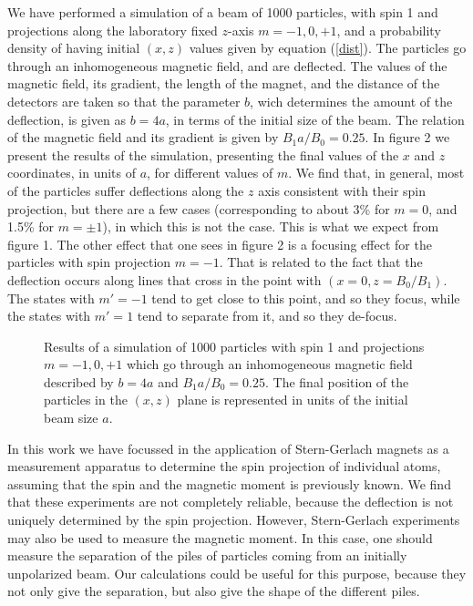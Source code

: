 \documentclass[aps,preprint,prl]{revtex4-2}
\begin{document}
We have performed a simulation of a beam of 1000
particles, with spin 1 and projections along the laboratory fixed $z$-axis 
$m=-1,0,+1$,
and  a  probability density of having initial $(x,z)$ values 
given by equation (\ref{dist}).  The particles go through  an inhomogeneous 
magnetic field, and are deflected. The values of the magnetic field, 
its gradient, the length of the magnet, and the distance of the detectors are
taken so that the parameter $b$, wich determines the amount of the deflection, 
is given as $b=4a$, in terms of the initial size of the beam. 
The relation of the
magnetic field and its gradient is given by $B_1a/B_0=0.25$.
In figure 2 we present the results of the simulation, presenting the final 
values of the $x$ and $z$ coordinates, in units of $a$, for different values 
of $m$. We find that, in general, most of the particles suffer deflections
along the $z$ axis consistent with their spin projection, but there are a few
cases (corresponding to about 3\% for $m=0$, and 1.5\% for $m=\pm1$), in which
this is not the case. This is what we expect from figure 1. The other effect
that one sees in figure 2 is a focusing effect for the particles with spin
projection $m=-1$. That is related to the fact that the deflection occurs
along lines that cross in the point with $(x=0, z=B_0/B_1)$.  The states with
$m'=-1$ tend to get close to this point, and so they focus, while the states
with $m'=1$ tend to separate from it, and so they de-focus.
    
\begin{center}
\begin{figure}
\mbox{}
\caption{Results of a simulation of 1000 particles with spin 1 and projections
$m=-1,0,+1$ which go through an inhomogeneous magnetic field described by
$b=4a$ and $B_1a/B_0=0.25$. The final position of the particles in the $(x,z)$
plane is represented in units of the initial beam size $a$.}
\end{figure}
\end{center}

In this work we have focussed in the application of Stern-Gerlach magnets as
a measurement apparatus to determine the spin projection of individual atoms,
assuming that the spin and the magnetic moment is previously known. 
We find that these experiments are
not completely reliable, because the deflection is not uniquely determined by 
the spin projection. However, Stern-Gerlach experiments may also be used
to measure the magnetic moment. In this case, one should measure the separation
of the piles of particles coming from an initially unpolarized beam. 
Our calculations could be useful for this purpose, because they not only give
the separation, but also give the shape of the different piles. 
\end{document}
